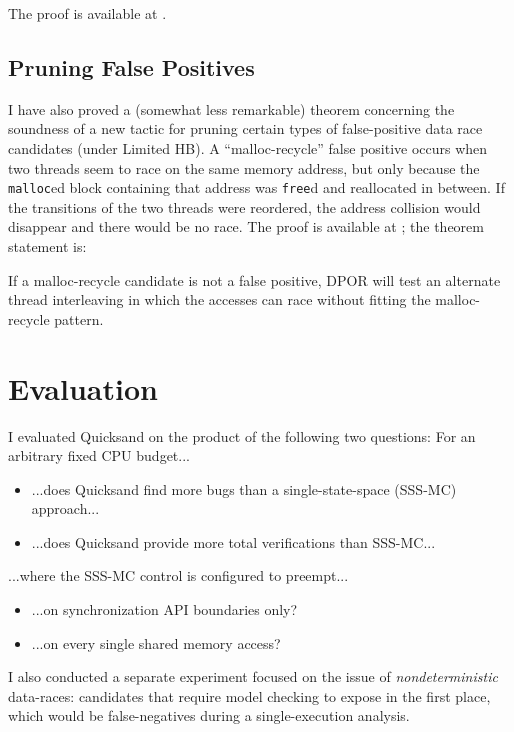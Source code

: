 The proof is available at \cite{quicksand-soundness}.

\subsection{Pruning False Positives} %
I have also proved a (somewhat less remarkable) theorem concerning the soundness of a new tactic for pruning certain types of false-positive data race candidates (under Limited HB).
A ``malloc-recycle'' false positive occurs when two threads seem to race on the same memory address, but only because the {\tt malloc}ed block containing that address was {\tt free}d and reallocated in between.
If the transitions of the two threads were reordered, the address collision would disappear and there would be no race.
The proof is available at \cite{quicksand-soundness}; the theorem statement is:

\begin{theorem}
	If a malloc-recycle candidate is not a false positive,
	DPOR will test an alternate thread interleaving in which the
	accesses can race without fitting the malloc-recycle pattern.
\end{theorem}


\section{Evaluation}
\label{sec:quicksand-eval}

I evaluated Quicksand on the product of the following two questions: For an arbitrary fixed CPU budget...

\begin{itemize}
	\item ...does Quicksand find more bugs than a single-state-space (SSS-MC) approach...
	\item ...does Quicksand provide more total verifications than SSS-MC...
\end{itemize}
...where the SSS-MC control is configured to preempt...
\begin{itemize}
	\item ...on synchronization API boundaries only?
	\item ...on every single shared memory access?
\end{itemize}

I also conducted a separate experiment focused on the issue of {\em nondeterministic} data-races:
candidates that require model checking to expose in the first place, which would be
false-negatives during a single-execution analysis.

